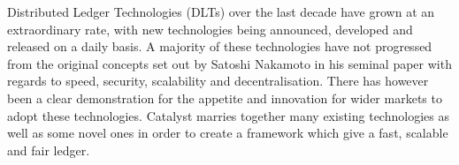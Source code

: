 Distributed Ledger Technologies (DLTs) over the last decade have grown at an extraordinary rate, with new technologies being announced, developed and released on a daily basis. A majority of these technologies have not progressed from the original concepts set out by Satoshi Nakamoto in his seminal paper \cite{nakamoto2008bitcoin} with regards to speed, security, scalability and decentralisation. There has however been a clear demonstration for the appetite and innovation for wider markets to adopt these technologies. Catalyst marries together many existing technologies as well as some novel ones in order to create a framework which give a fast, scalable and fair ledger.